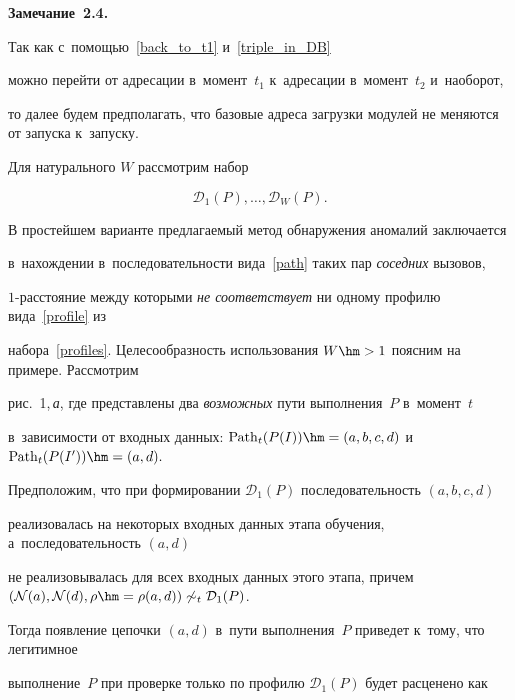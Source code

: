\noindent

\textbf{Замечание~2.4.}\

Так как с~помощью~\eqref{back_to_t1} и~\eqref{triple_in_DB} 

можно перейти от адресации в~момент~$t_1$ к~адресации в~момент~$t_2$ и~наоборот, 

то далее будем предполагать, что базовые адреса загрузки модулей не меняются от запуска к~запуску. 





\smallskip



Для натурального $W$ рассмотрим набор

\begin{equation}

\label{profiles}

\mathcal{D}_1(P), \ldots,\mathcal{D}_W(P).

\end{equation} 

В простейшем варианте предлагаемый метод обнаружения аномалий заключается 

в~нахождении в~последовательности вида~\eqref{path} таких пар \textit{соседних} вызовов, 

$1$-рас\-сто\-яние между которыми  \textit{не соответствует} ни одному профилю вида~\eqref{profile} из 

набора~\eqref{profiles}. Целесообразность использования $W\hm>1$ поясним на примере. Рассмотрим 

рис.~1,\,\textit{а}, где представлены два \textit{возможных} пути выполнения~$P$ в~момент~$t$ 

в~зависимости от входных данных: $\mathrm{Path}_t(P(I))\hm=(a,b,c,d)$ и~$\mathrm{Path}_t(P(I'))\hm=(a,d).$ 

Предположим, что при формировании $\mathcal{D}_{1}(P)$ последовательность $(a,b,c,d)$ 

реализовалась на некоторых входных данных этапа обучения, а~последовательность $(a,d)$ 

не реализовывалась для всех входных данных этого этапа, причем $(\mathcal{N}(a),\mathcal{N}(d), 

\rho\hm=\rho(a,d))\not \sim_{t} \mathcal{D}_{1}(P)$. 

Тогда появление цепочки $(a,d)$ в~пути выполнения~$P$ приведет к~тому, что легитимное 

выполнение~$P$ при проверке только по профилю $\mathcal{D}_{1}(P)$ будет расценено как 

